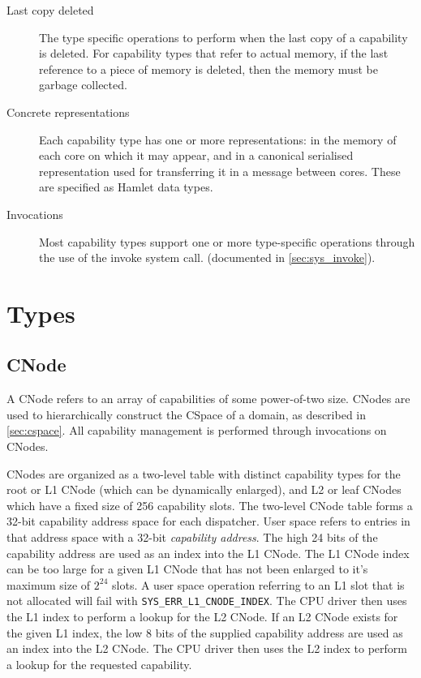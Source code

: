 \begin{description}
\item[Last copy deleted] The type specific operations to perform when
  the last copy of a capability is deleted. For capability types
    that refer to actual memory, if the last reference to a piece of
    memory is deleted, then the memory must be garbage collected.

\item[Concrete representations] Each capability type has one or more
  representations: in the memory of each core on which it may appear,
  and in a canonical serialised representation used for transferring
  it in a message between cores. These are specified as
  Hamlet\cite{dagand:fof:plos09} data types.

\item[Invocations] Most capability types support one or more
  type-specific operations through the use of the invoke system call.
  (documented in \ref{sec:sys_invoke}).
\end{description}

\section{Types}
  
\subsection{CNode}\label{sec:cnode}

A CNode refers to an array of capabilities of some power-of-two size.
CNodes are used to hierarchically construct the CSpace of a domain, as
described in \ref{sec:cspace}.  All capability management is
performed through invocations on CNodes.

CNodes are organized as a two-level table with distinct capability types for
the root or L1 CNode (which can be dynamically enlarged), and L2 or leaf
CNodes which have a fixed size of 256 capability slots.
The two-level CNode table forms a 32-bit capability address space for each
dispatcher.
User space refers to entries in that address space with a 32-bit
\emph{capability address}.
The high 24 bits of the capability address are used as an index into the L1
CNode.
The L1 CNode index can be too large for a given L1 CNode that has not been
enlarged to it's maximum size of $2^24$ slots.
A user space operation referring to an L1 slot that is not allocated will fail
with \verb|SYS_ERR_L1_CNODE_INDEX|.
The CPU driver then uses the L1 index to perform a lookup for the L2 CNode.
If an L2 CNode exists for the given L1 index, the low 8 bits of the supplied
capability address are used as an index into the L2 CNode.
The CPU driver then uses the L2 index to perform a lookup for the requested
capability.


